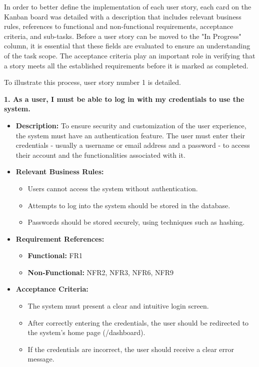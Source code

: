 In order to better define the implementation of each user story, each card on the Kanban board was detailed with a description that includes relevant business rules, references to functional and non-functional requirements, acceptance criteria, and sub-tasks. Before a user story can be moved to the "In Progress" column, it is essential that these fields are evaluated to ensure an understanding of the task scope. The acceptance criteria play an important role in verifying that a story meets all the established requirements before it is marked as completed.

To illustrate this process, user story number 1 is detailed.

\textbf{1. As a user, I must be able to log in with my credentials to use the system.}
\begin{itemize}
    \item \textbf{Description:} To ensure security and customization of the user experience, the system must have an authentication feature. The user must enter their credentials - usually a username or email address and a password - to access their account and the functionalities associated with it.
    \item \textbf{Relevant Business Rules:} 
        \begin{itemize}
            \item Users cannot access the system without authentication.
            \item Attempts to log into the system should be stored in the database.
            \item Passwords should be stored securely, using techniques such as hashing.
        \end{itemize}

    \item \textbf{Requirement References:}
        \begin{itemize}
            \item \textbf{Functional:} FR1
            \item \textbf{Non-Functional:} NFR2, NFR3, NFR6, NFR9 
        \end{itemize}

    \item \textbf{Acceptance Criteria:}
        \begin{itemize}
            \item The system must present a clear and intuitive login screen.
            \item After correctly entering the credentials, the user should be redirected to the system's home page (/dashboard).
            \item If the credentials are incorrect, the user should receive a clear error message.
        \end{itemize}


\end{itemize}

